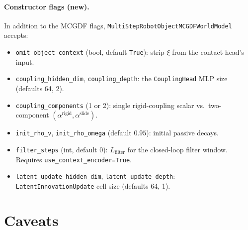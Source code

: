 \documentclass[11pt]{article}
\begin{document}
\paragraph{Constructor flags (new).}  In addition to the MCGDF
flags, \texttt{MultiStepRobotObjectMCGDFWorldModel} accepts:
\begin{itemize}
  \item \texttt{omit\_object\_context} (bool, default
    \texttt{True}): strip $\xi$ from the contact head's input.
  \item \texttt{coupling\_hidden\_dim}, \texttt{coupling\_depth}: the
    \texttt{CouplingHead} MLP size (defaults 64, 2).
  \item \texttt{coupling\_components} (1 or 2): single
    rigid-coupling scalar vs.\ two-component
    $(\alpha^{\mathrm{rigid}}, \alpha^{\mathrm{slide}})$.
  \item \texttt{init\_rho\_v}, \texttt{init\_rho\_omega} (default
    $0.95$): initial passive decays.
  \item \texttt{filter\_steps} (int, default $0$): $L_{\mathrm{filter}}$
    for the closed-loop filter window.  Requires
    \texttt{use\_context\_encoder=True}.
  \item \texttt{latent\_update\_hidden\_dim},
    \texttt{latent\_update\_depth}: \texttt{LatentInnovationUpdate}
    cell size (defaults 64, 1).
\end{itemize}

\section{Caveats}
\end{document}
